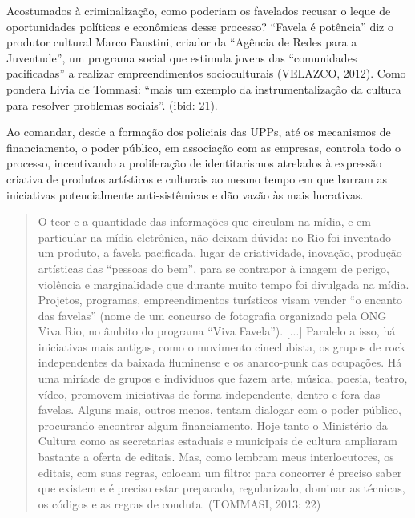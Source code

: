 Acostumados à criminalização, como poderiam os favelados recusar o leque
de oportunidades políticas e econômicas desse processo? ``Favela é
potência'' diz o produtor cultural Marco Faustini, criador da ``Agência
de Redes para a Juventude'', um programa social que estimula jovens das
``comunidades pacificadas'' a realizar empreendimentos socioculturais
(VELAZCO, 2012). Como pondera Livia de Tommasi: ``mais um exemplo da
instrumentalização da cultura para resolver problemas sociais''. (ibid:
21).

Ao comandar, desde a formação dos policiais das UPPs, até os mecanismos
de financiamento, o poder público, em associação com as empresas,
controla todo o processo, incentivando a proliferação de identitarismos
atrelados à expressão criativa de produtos artísticos e culturais ao
mesmo tempo em que barram as iniciativas potencialmente anti-sistêmicas
e dão vazão às mais lucrativas.

\begin{quote}
O teor e a quantidade das informações que circulam na mídia, e em
particular na mídia eletrônica, não deixam dúvida: no Rio foi inventado
um produto, a favela pacificada, lugar de criatividade, inovação,
produção artísticas das ``pessoas do bem'', para se contrapor à imagem
de perigo, violência e marginalidade que durante muito tempo foi
divulgada na mídia. Projetos, programas, empreendimentos turísticos
visam vender ``o encanto das favelas'' (nome de um concurso de
fotografia organizado pela ONG Viva Rio, no âmbito do programa ``Viva
Favela''). {[}...{]} Paralelo a isso, há iniciativas mais antigas, como
o movimento cineclubista, os grupos de rock independentes da baixada
fluminense e os anarco-punk das ocupações. Há uma miríade de grupos e
indivíduos que fazem arte, música, poesia, teatro, vídeo, promovem
iniciativas de forma independente, dentro e fora das favelas. Alguns
mais, outros menos, tentam dialogar com o poder público, procurando
encontrar algum financiamento. Hoje tanto o Ministério da Cultura como
as secretarias estaduais e municipais de cultura ampliaram bastante a
oferta de editais. Mas, como lembram meus interlocutores, os editais,
com suas regras, colocam um filtro: para concorrer é preciso saber que
existem e é preciso estar preparado, regularizado, dominar as técnicas,
os códigos e as regras de conduta. (TOMMASI, 2013: 22)
\end{quote}

